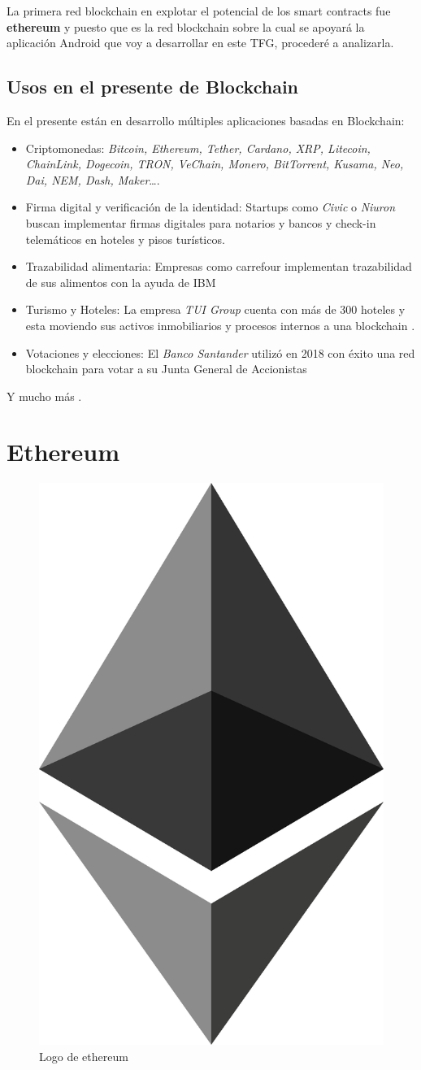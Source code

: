 La primera red blockchain en explotar el potencial de los smart contracts fue \textbf{ethereum} y puesto que es la red blockchain sobre la cual se apoyará la aplicación Android que voy a desarrollar en este TFG, procederé a analizarla.

\subsection{Usos en el presente de Blockchain}
En el presente están en desarrollo múltiples aplicaciones basadas en Blockchain:

\begin{itemize}
\item Criptomonedas: \textit{Bitcoin, Ethereum, Tether, Cardano, XRP, Litecoin, ChainLink, Dogecoin, TRON, VeChain, Monero, BitTorrent, Kusama, Neo, Dai, NEM, Dash, Maker}\dots \cite{listaCripto}.
\item Firma digital y verificación de la identidad: Startups como \textit{Civic} o \textit{Niuron}\cite{civic, niuron} buscan implementar firmas digitales para notarios y bancos y check-in telemáticos en hoteles y pisos turísticos.
\item Trazabilidad alimentaria: Empresas como carrefour implementan trazabilidad de sus alimentos con la ayuda de IBM \cite{carrefour}
\item Turismo y Hoteles: La empresa \textit{TUI Group} cuenta con más de 300 hoteles y esta moviendo sus activos inmobiliarios y procesos internos a una blockchain \cite{tuig}.
\item Votaciones y elecciones: El \textit{Banco Santander} utilizó en 2018 con éxito una red blockchain para votar a su Junta General de Accionistas\cite{santanderVotacion}
\end{itemize}

Y mucho más \cite{appCripto}.

\section{Ethereum}

\begin{figure}[h!]
  \centering
  \includegraphics[width=0.2\linewidth]{figs/EstadoArte/Ethereum/ethereumLOGO}
  \caption[Ethereum]{Logo de ethereum}
  \label{fig:ethereum}
\end{figure}

